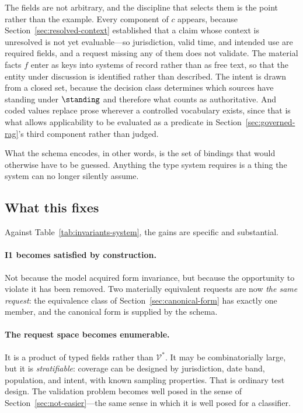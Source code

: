 The fields are not arbitrary, and the discipline that selects them is the point rather
than the example. Every component of $c$ appears, because
Section~\ref{sec:resolved-context} established that a claim whose context is unresolved is
not yet evaluable---so jurisdiction, valid time, and intended use are required fields, and
a request missing any of them does not validate. The material facts $f$ enter as keys into
systems of record rather than as free text, so that the entity under discussion is
identified rather than described. The intent is drawn from a closed set, because the
decision class determines which sources have standing under $\standing$ and therefore what
counts as authoritative. And coded values replace prose wherever a controlled vocabulary
exists, since that is what allows applicability to be evaluated as a predicate in
Section~\ref{sec:governed-rag}'s third component rather than judged.

What the schema encodes, in other words, is the set of bindings that would otherwise have
to be guessed. Anything the type system requires is a thing the system can no longer
silently assume.

\subsection{What this fixes}

Against Table~\ref{tab:invariants-system}, the gains are specific and substantial.

\paragraph{I1 becomes satisfied by construction.} Not because the model acquired form
invariance, but because the opportunity to violate it has been removed. Two
materially equivalent requests are now \emph{the same request}: the equivalence class
of Section~\ref{sec:canonical-form} has exactly one member, and the canonical form is
supplied by the schema.

\paragraph{The request space becomes enumerable.} It is a product of typed fields
rather than $\mathcal{V}^{*}$. It may be combinatorially large, but it is
\emph{stratifiable}: coverage can be designed by jurisdiction, date band, population,
and intent, with known sampling properties. That is ordinary test design. The
validation problem becomes well posed in the sense of
Section~\ref{sec:not-easier}---the same sense in which it is well posed for a
classifier.

